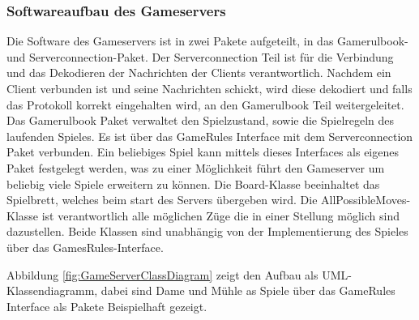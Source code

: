 \documentclass[12pt,a4paper,bibliography=totocnumbered,listof=totocnumbered]{article}
\begin{document}
\subsubsection{Softwareaufbau des Gameservers}
Die Software des Gameservers ist in zwei Pakete aufgeteilt, in das Gamerulbook- und Serverconnection-Paket.
Der Serverconnection Teil ist für die Verbindung und das Dekodieren der Nachrichten der Clients verantwortlich.
Nachdem ein Client verbunden ist und seine Nachrichten schickt, wird diese dekodiert und falls das Protokoll korrekt eingehalten wird,
an den Gamerulbook Teil weitergeleitet. Das Gamerulbook Paket verwaltet den Spielzustand, sowie die Spielregeln des laufenden Spieles.
Es ist über das GameRules Interface mit dem Serverconnection Paket verbunden. Ein beliebiges Spiel kann mittels dieses Interfaces
als eigenes Paket festgelegt werden, was zu einer Möglichkeit führt den Gameserver um beliebig viele Spiele erweitern zu können.
Die Board-Klasse beeinhaltet das Spielbrett, welches beim start des Servers übergeben wird. Die AllPossibleMoves-Klasse ist 
verantwortlich alle möglichen Züge die in einer Stellung möglich sind dazustellen. Beide Klassen sind unabhängig von
der Implementierung des Spieles über das GamesRules-Interface.

Abbildung \ref{fig:GameServerClassDiagram} zeigt den Aufbau als UML-Klassendiagramm, dabei sind Dame und Mühle as Spiele über das
GameRules Interface als Pakete Beispielhaft gezeigt. 
\end{document}
